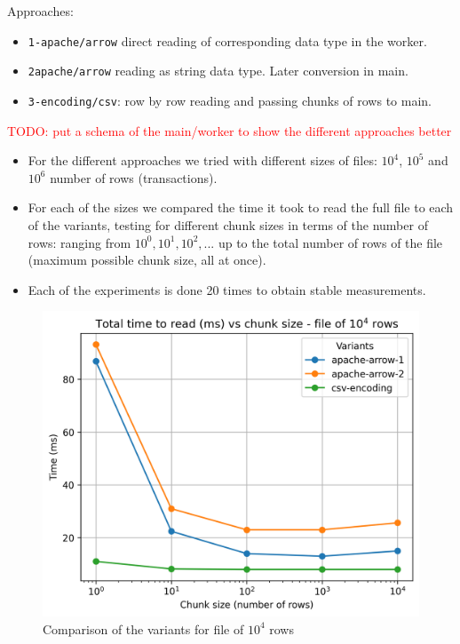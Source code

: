 \documentclass[12pt,a4paper]{article}
\begin{document}
Approaches:
\begin{itemize}
  \item \texttt{1-apache/arrow} direct reading of corresponding data type in the worker.
  \item \texttt{2apache/arrow} reading as string data type. Later conversion in main.
  \item \texttt{3-encoding/csv}: row by row reading and passing chunks of rows to main.
\end{itemize}

\textcolor{red}{TODO: put a schema of the main/worker to show the different approaches better}

\begin{itemize}
  \item For the different approaches we tried with different sizes of files: $10^4$, $10^5$ and $10^6$ number of rows (transactions).
  \item For each of the sizes we compared the time it took to read the full file to each of the variants, testing for different chunk sizes in terms of the number of rows: ranging from $10^0, 10^1, 10^2,...$ up to the total number of rows of the file (maximum possible chunk size, all at once).
  \item Each of the experiments is done 20 times to obtain stable measurements.
\end{itemize}


\begin{figure}[H]
  \centering
  \includegraphics[scale = 0.7]{images/4-Experiments/read-input-10-4.png}
  \caption{Comparison of the variants for file of $10^4$ rows}
\end{figure}
\end{document}
